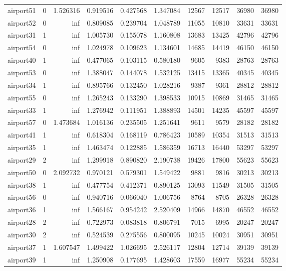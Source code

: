 \begin{longtable}{|l|r|r|r|r|r|r|r|r|r|}
airport51 & 0 & 1.526316 & 0.919516 & 0.427568 & 1.347084 & 12567 & 12517 & 36980 & 36980 \\
airport52 & 0 & inf & 0.809085 & 0.239704 & 1.048789 & 11055 & 10810 & 33631 & 33631 \\
airport31 & 1 & inf & 1.005730 & 0.155078 & 1.160808 & 13683 & 13425 & 42796 & 42796 \\
airport54 & 0 & inf & 1.024978 & 0.109623 & 1.134601 & 14685 & 14419 & 46150 & 46150 \\
airport40 & 1 & inf & 0.477065 & 0.103115 & 0.580180 & 9605 & 9383 & 28763 & 28763 \\
airport53 & 0 & inf & 1.388047 & 0.144078 & 1.532125 & 13415 & 13365 & 40345 & 40345 \\
airport34 & 1 & inf & 0.895766 & 0.132450 & 1.028216 & 9387 & 9361 & 28812 & 28812 \\
airport55 & 0 & inf & 1.265243 & 0.133290 & 1.398533 & 10915 & 10869 & 31465 & 31465 \\
airport33 & 1 & inf & 1.276942 & 0.111951 & 1.388893 & 14501 & 14235 & 45597 & 45597 \\
airport57 & 0 & 1.473684 & 1.016136 & 0.235505 & 1.251641 & 9611 & 9579 & 28182 & 28182 \\
airport41 & 1 & inf & 0.618304 & 0.168119 & 0.786423 & 10589 & 10354 & 31513 & 31513 \\
airport35 & 1 & inf & 1.463474 & 0.122885 & 1.586359 & 16713 & 16440 & 53297 & 53297 \\
airport29 & 2 & inf & 1.299918 & 0.890820 & 2.190738 & 19426 & 17800 & 55623 & 55623 \\
airport50 & 0 & 2.092732 & 0.970121 & 0.579301 & 1.549422 & 9881 & 9816 & 30213 & 30213 \\
airport38 & 1 & inf & 0.477754 & 0.412371 & 0.890125 & 13093 & 11549 & 31505 & 31505 \\
airport56 & 0 & inf & 0.940716 & 0.066040 & 1.006756 & 8764 & 8705 & 26328 & 26328 \\
airport36 & 1 & inf & 1.566167 & 0.954242 & 2.520409 & 14966 & 14870 & 46552 & 46552 \\
airport28 & 2 & inf & 0.722973 & 0.083818 & 0.806791 & 7015 & 6995 & 20247 & 20247 \\
airport30 & 2 & inf & 0.524539 & 0.275556 & 0.800095 & 10245 & 10024 & 30951 & 30951 \\
airport37 & 1 & 1.607547 & 1.499422 & 1.026695 & 2.526117 & 12804 & 12714 & 39139 & 39139 \\
airport39 & 1 & inf & 1.250908 & 0.177695 & 1.428603 & 17559 & 16977 & 55234 & 55234 \\

\end{longtable}
